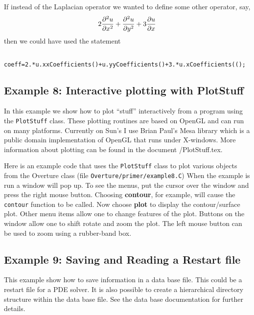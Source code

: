 \documentclass{article}
\begin{document}
If instead of the Laplacian operator we wanted to define
some other operator, say,
$$
   2{\partial^2 u \over \partial x^2} 
 +  {\partial^2 u \over \partial y^2} 
 + 3{\partial u \over \partial x} 
$$
then we could have used the statement
{\footnotesize
\begin{verbatim}
    coeff=2.*u.xxCoefficients()+u.yyCoefficients()+3.*u.xCoefficients(();
\end{verbatim}
}


\vfill\eject
\subsection{Example 8: Interactive plotting with PlotStuff}

 In this example we show how to plot ``stuff'' interactively from a
program using the {\tt PlotStuff} class. These plotting routines
are based on OpenGL and can run on many platforms. Currently 
on Sun's I use Brian Paul's Mesa library which is a public domain implementation of
OpenGL that runs under X-windows.
More information about plotting can be found in the document
\ogshow/PlotStuff.tex.

Here is an example code that uses the {\tt PlotStuff} class to plot
various objects from the Overture class
(file {\tt Overture/primer/example8.C})
{\footnotesize
{}
}
When the example is run
a window will pop up. To see the menus, put the cursor over the window and
press the right mouse button. 
Choosing {\bf contour}, for example, will
cause the {\tt contour} function to be called. Now choose {\bf plot} to
display the contour/surface plot. Other menu items allow one to change
features of the plot. 
Buttons on the window allow one to shift rotate and zoom the plot.
The left mouse button can be used to zoom using a rubber-band box.

\vfill\eject
\subsection{Example 9: Saving and Reading a Restart file}

This example show how to save information in a data base file. This could
be a restart file for a PDE solver. It is also possible to create a hierarchical
directory structure within the data base file. See the data base documentation
for further details.
\end{document}
